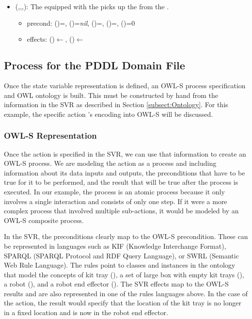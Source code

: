\begin{itemize}
\item {}(,,,): The   equipped with the   picks up the   from the  .
\begin{itemize}
\item precond: ()=, ()=\textit{nil}, ()=, ()=, ()=0
\item effects: ()$\leftarrow$, ()$\leftarrow$
\end{itemize}
\end{itemize}




\subsection{Process for the PDDL Domain File}
\label{subsect:PDDL_Domain_File}
Once the state variable representation is defined, an OWL-S process specification and OWL ontology is built. This must be constructed by hand from the information in the SVR as described in Section \ref{subsect:Ontology}. For this example, the specific action  's encoding into OWL-S will be discussed.

\subsubsection{OWL-S Representation}
Once the action is specified in the SVR, we can use that information to create an OWL-S process. We are modeling the action as a process and including information about its data inputs and outputs, the preconditions that have to be true for it to be performed, and the result that will be true after the process is executed. In our example, the process is an atomic process because it only involves a single interaction and consists of only one step. If it were a more complex process that involved multiple sub-actions, it would be modeled by an OWL-S composite process.

In the SVR, the preconditions clearly map to the OWL-S precondition. These can be represented in languages such as KIF \cite{KIF} (Knowledge Interchange Format), SPARQL \cite{SPARQL} (SPARQL Protocol and RDF Query Language), or SWRL \cite{SWRL-W3C} (Semantic Web Rule Language). The rules point to classes and instances in the ontology that model the concepts of kit tray (), a set of large box with empty kit trays (), a robot (), and a robot end effector (). The SVR effects map to the OWL-S results and are also represented in one of the rules languages above. In the case of the  action, the result would specify that the location of the kit tray is no longer in a fixed location and is now in the robot end effector.

